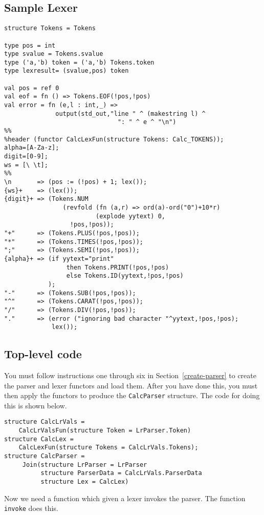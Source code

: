 \subsection{Sample Lexer}
\begin{tt}
\begin{verbatim}
structure Tokens = Tokens

type pos = int
type svalue = Tokens.svalue
type ('a,'b) token = ('a,'b) Tokens.token
type lexresult= (svalue,pos) token

val pos = ref 0
val eof = fn () => Tokens.EOF(!pos,!pos)
val error = fn (e,l : int,_) =>
              output(std_out,"line " ^ (makestring l) ^
                               ": " ^ e ^ "\n")
%%
%header (functor CalcLexFun(structure Tokens: Calc_TOKENS));
alpha=[A-Za-z];
digit=[0-9];
ws = [\ \t];
%%
\n       => (pos := (!pos) + 1; lex());
{ws}+    => (lex());
{digit}+ => (Tokens.NUM
                (revfold (fn (a,r) => ord(a)-ord("0")+10*r)
                         (explode yytext) 0,
                  !pos,!pos));
"+"      => (Tokens.PLUS(!pos,!pos));
"*"      => (Tokens.TIMES(!pos,!pos));
";"      => (Tokens.SEMI(!pos,!pos));
{alpha}+ => (if yytext="print"
                 then Tokens.PRINT(!pos,!pos)
                 else Tokens.ID(yytext,!pos,!pos)
            );
"-"      => (Tokens.SUB(!pos,!pos));
"^"      => (Tokens.CARAT(!pos,!pos));
"/"      => (Tokens.DIV(!pos,!pos));
"."      => (error ("ignoring bad character "^yytext,!pos,!pos);
             lex());
\end{verbatim}
\end{tt}
\subsection{Top-level code}

You must follow instructions one through six in Section~\ref{create-parser}
to create the parser and lexer functors and load them.  After you have
done this, you must then apply the functors to produce the {\tt CalcParser}
structure.  The code for doing this is shown below.
\begin{verbatim}
structure CalcLrVals =
    CalcLrValsFun(structure Token = LrParser.Token)
structure CalcLex =
    CalcLexFun(structure Tokens = CalcLrVals.Tokens);
structure CalcParser =
     Join(structure LrParser = LrParser
          structure ParserData = CalcLrVals.ParserData
          structure Lex = CalcLex)
\end{verbatim}
 
Now we need a function which given a lexer invokes the parser.  The
function {\tt invoke} does this.

